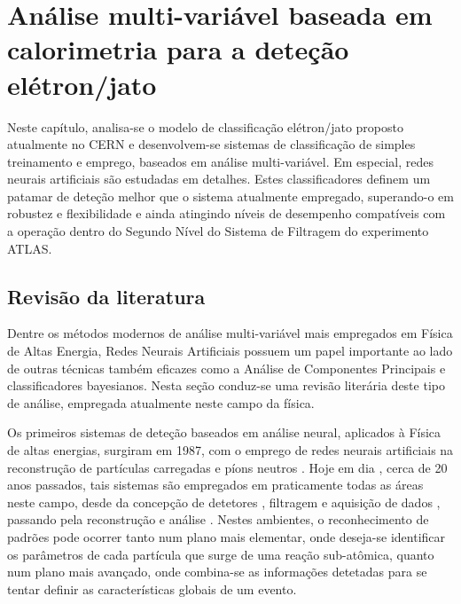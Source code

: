 \typeout{ ====================================================================}
\typeout{ ====================================================================}

\chapter{Análise multi-variável baseada em calorimetria para a deteção
elétron/jato} 
\label{chap:neural}

Neste capítulo, analisa-se o modelo de classificação elétron/jato proposto
atualmente no CERN e desenvolvem-se sistemas de classificação de simples
treinamento e emprego, baseados em análise multi-variável. Em especial, redes
neurais artificiais são estudadas em detalhes. Estes classificadores definem
um patamar de deteção melhor que o sistema atualmente empregado, superando-o
em robustez e flexibilidade e ainda atingindo níveis de desempenho compatíveis
com a operação dentro do Segundo Nível do Sistema de Filtragem do experimento
ATLAS.

\section{Revisão da literatura}
\label{sec:review}

Dentre os métodos modernos de análise multi-variável mais empregados em Física
de Altas Energia, Redes Neurais Artificiais possuem um papel importante ao
lado de outras técnicas também eficazes como a Análise de Componentes
Principais e classificadores bayesianos. Nesta seção conduz-se uma revisão
literária deste tipo de análise, empregada atualmente neste campo da física.

Os primeiros sistemas de deteção baseados em análise neural, aplicados à
Física de altas energias, surgiram em 1987, com o emprego de redes neurais
artificiais na reconstrução de partículas carregadas e píons neutros
\cite{denby-nim-1997}. Hoje em dia \cite{denby-nim-2004}, cerca de 20 anos
passados, tais sistemas são empregados em praticamente todas as áreas neste
campo, desde da concepção de detetores \cite{wilk-nim-2006}, filtragem e
aquisição de dados \cite{denby-nim-2003, kohne-nim-1997, varela-cms-1998},
passando pela reconstrução  \cite{peterson-nim-1988} e análise
\cite{kiesling-nim-2004, bhat-api-1995}. Nestes ambientes, o reconhecimento de
padrões pode ocorrer tanto num plano mais elementar, onde deseja-se
identificar os parâmetros de cada partícula que surge de uma reação
sub-atômica, quanto num plano mais avançado, onde combina-se as informações
detetadas para se tentar definir as características globais de um evento.

